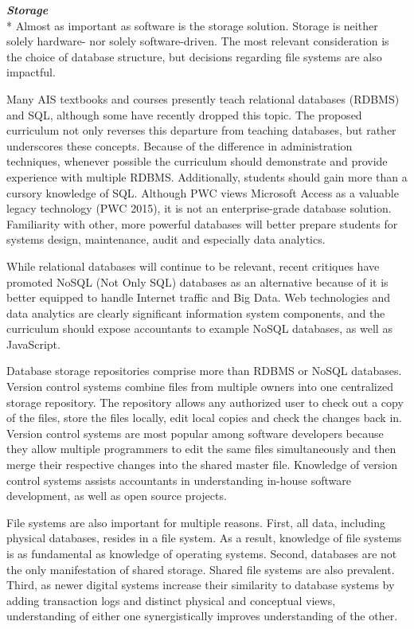 \documentclass[12pt]{article}
\newcommand{\SubSubSection}[1]{{\centering{}\normalsize{}\textbf{\emph{#1}}}\\*\indent{}}
\begin{document}
\SubSubSection{Storage}
Almost as important as software is the storage solution. Storage is neither solely hardware- nor solely software-driven. The most relevant consideration is the choice of database structure, but decisions regarding file systems are also impactful.

Many AIS textbooks and courses presently teach relational databases (RDBMS) and SQL, although some have recently dropped this topic. The proposed curriculum not only reverses this departure from teaching databases, but rather underscores these concepts. Because of the difference in administration techniques, whenever possible the curriculum should demonstrate and provide experience with multiple RDBMS. Additionally, students should gain more than a cursory knowledge of SQL. Although PWC views Microsoft Access as a valuable legacy technology (PWC 2015), it is not an enterprise-grade database solution. Familiarity with other, more powerful databases will better prepare students for systems design, maintenance, audit and especially data analytics.

While relational databases will continue to be relevant, recent critiques have promoted NoSQL (Not Only SQL) databases as an alternative because of it is better equipped to handle Internet traffic and Big Data. Web technologies and data analytics are clearly significant information system components, and the curriculum should expose accountants to example NoSQL databases, as well as JavaScript.

Database storage repositories comprise more than RDBMS or NoSQL databases. Version control systems combine files from multiple owners into one centralized storage repository. The repository allows any authorized user to check out a copy of the files, store the files locally, edit local copies and check the changes back in. Version control systems are most popular among software developers because they allow multiple programmers to edit the same files simultaneously and then merge their respective changes into the shared master file. Knowledge of version control systems assists accountants in understanding in-house software development, as well as open source projects.

File systems are also important for multiple reasons. First, all data, including physical databases, resides in a file system. As a result, knowledge of file systems is as fundamental as knowledge of operating systems. Second, databases are not the only manifestation of shared storage. Shared file systems are also prevalent. Third, as newer digital systems increase their similarity to database systems by adding transaction logs and distinct physical and conceptual views, understanding of either one synergistically improves understanding of the other.
\end{document}
